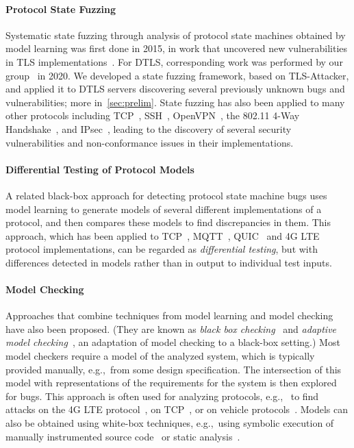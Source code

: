 \documentclass[11pt]{article}
\newcommand{\system}[1]{\mbox{\textsf{#1}}}
\newcommand{\myparagraph}{}
\let\myparagraph=\paragraph
\renewcommand{\paragraph}{\vspace{-3mm}\myparagraph}
\newcommand{\eg}{e.\/g.,\ }
\begin{document}
\paragraph{Protocol State Fuzzing}
Systematic state fuzzing through analysis of protocol state machines obtained
by model learning was first done in 2015, in work that uncovered new
vulnerabilities in TLS implementations~\cite{ruiter2015}.
%
For DTLS, corresponding work was performed by our group~\cite{DTLS@USENIX-20}
in 2020.  We developed a state fuzzing framework,
based on \system{TLS-Attacker}, and applied it to DTLS servers discovering
several previously unknown bugs and vulnerabilities; more in~\cref{sec:prelim}.
%
State fuzzing has also been applied to many other protocols including
TCP~\cite{FJV2016}, SSH~\cite{SSH@SPIN-2017},
OpenVPN~\cite{OpenVPN@EuroSPW-2018}, the 802.11 4-Way
Handshake~\cite{stone2018}, and IPsec~\cite{guo2019model}, leading to the
discovery of several security vulnerabilities and non-conformance issues in
their implementations.
%

\paragraph{Differential Testing of Protocol Models}
A related black-box approach for detecting protocol state machine bugs uses
model learning to generate models of several different implementations of a
protocol, and then compares these models to find discrepancies in them.
%
This approach, which has been applied to TCP~\cite{SFADiff},
MQTT~\cite{Tappler@ICST-2017}, QUIC~\cite{Prognosis@SIGCOMM-21} and 4G
LTE~\cite{DIKEUE@CCS-21} protocol implementations, can be regarded as
\emph{differential testing}, but with differences detected in models rather
than in output to individual test inputs.

\paragraph{Model Checking}
Approaches that combine techniques from model learning and model
checking~\cite{MC:handbook} have also been proposed.
%
(They are known as \emph{black box checking}~\cite{BBC} and \emph{adaptive
model checking}~\cite{AdaptiveMC}, an adaptation of model checking to a
black-box setting.)
%
Most model checkers require a model of the analyzed system, which is typically
provided manually, \eg from some design specification.  The intersection of
this model with representations of the requirements for the system is then
explored for bugs.  This approach is often used for analyzing protocols, \eg
to find attacks on the 4G LTE protocol~\cite{LTEInspector}, on
TCP~\cite{Jero@DSN-15}, or on vehicle protocols~\cite{Hu:usenix21}.
Models can also be obtained using white-box techniques, \eg using symbolic
execution of manually instrumented source code~\cite{Hoque@DSN-17,Themis:ccs21}
or static analysis~\cite{Cao:ccs19}.
\end{document}
